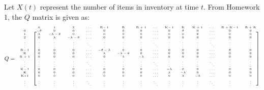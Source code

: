 \documentclass[12pt]{article}
\newcommand{\matindexx}[1]{\mbox{\tiny#1}}%
\begin{document}
Let $X(t)$ represent the number of items in inventory at time $t$. From Homework 1, the $Q$ matrix is given as: \begin{equation*}
    Q = \tiny\begin{blockarray}{ccccccccccccccc}
        & \matindexx{0} & \matindexx{1} & \matindexx{2} & \matindexx{\dots} & \matindexx{R - 1} & \matindexx{R} & \matindexx{R + 1} & \matindexx{\dots} & \matindexx{K - 1} & \matindexx{K} & \matindexx{K + 1} & \matindexx{\dots} & \matindexx{R + K - 1} & \matindexx{R + K} \\ 
        \begin{block}{c[cccccccccccccc]}
            \matindexx{0} & -\theta & 0 & 0 & \dots & 0 & 0 & 0 & \dots & 0 & \theta & 0 & \dots & 0 & 0 \\
            \matindexx{1} & \lambda & -\lambda-\theta & 0 & \dots & 0 & 0 & 0 & \dots & 0 & 0 & \theta & \dots & 0 & 0 \\
            \matindexx{2} & 0 & \lambda & -\lambda-\theta & \dots & 0 & 0 & 0 & \dots & 0 & 0 & 0 & \dots & 0 & 0 \\
            \matindexx{\vdots} & \vdots & \vdots & \vdots & \ddots & \vdots & \vdots & \vdots & \ddots & \vdots & \vdots & \vdots & \ddots & \vdots & \vdots \\
            \matindexx{R - 1} & 0 & 0 & 0 & \dots & -\theta-\lambda & 0 & 0 & \dots & 0 & 0 & 0 & \dots & \theta & 0 \\
            \matindexx{R} & 0 & 0 & 0 & \dots & \lambda & -\lambda-\theta & 0 & \dots & 0 & 0 & 0 & \dots & 0 & 0 \\
            \matindexx{R + 1} & 0 & 0 & 0 & \dots & 0 & \lambda & -\lambda & \dots & 0 & 0 & 0 & \dots & 0 & 0 \\
            \matindexx{\vdots} & \vdots & \vdots & \vdots & \ddots & \vdots & \vdots & \vdots & \ddots & \vdots & \vdots & \vdots & \ddots & \vdots & \vdots \\
            \matindexx{K - 1} & 0 & 0 & 0 & \dots & 0 & 0 & 0 & \dots & -\lambda & 0 & 0 & \dots & 0 & 0 \\
            \matindexx{K} & 0 & 0 & 0 & \dots & 0 & 0 & 0 & \dots & \lambda & -\lambda & 0 & \dots & 0 & 0 \\
            \matindexx{K+1} & 0 & 0 & 0 & \dots & 0 & 0 & 0 & \dots & 0 & \lambda & -\lambda & \dots & 0 & 0 \\
            \matindexx{\vdots} & \vdots & \vdots & \vdots & \ddots & \vdots & \vdots & \vdots & \ddots & \vdots & \vdots & \vdots & \ddots & \vdots & \vdots \\

\end{block}
\end{blockarray}
\end{equation*}
\end{document}
